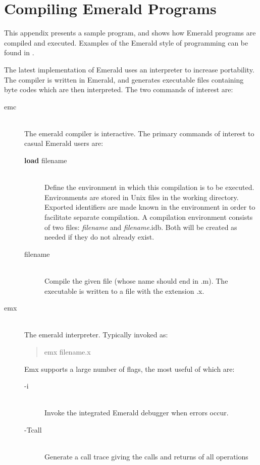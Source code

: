 \section{Compiling Emerald Programs}
\label{compiler appendix}

This appendix presents a sample \emd{} program, and shows how
Emerald programs are compiled and executed.
Examples of the Emerald style of programming can be found
in \cite{Raj90spe}.

The latest implementation of Emerald uses an interpreter to increase
portability.  The compiler is written in Emerald, and generates executable
files containing byte codes which are then interpreted.  The two commands of
interest are:
\begin{description}
  \item[emc]{}~\\
    The emerald compiler is interactive.  The primary commands of interest
    to casual Emerald users are:
    \begin{description}
      \item[{\bf load} filename]{} ~\\
	Define the environment in which this compilation is to be executed.
	Environments are stored in Unix files in the working directory.
	Exported identifiers are made known in the environment
	in order to facilitate separate compilation.  A compilation
	environment consists of two files:  {\it filename\/} and {\it
	filename\/}.idb.  Both will be created as needed if they do not
	already exist.
      \item[filename]{} ~\\
	Compile the given file (whose name should end in .m).  The
	executable is written to a file with the extension .x.
    \end{description}
  \item[emx]{} ~\\
    The emerald interpreter.  Typically invoked as:
    \begin{quote}
      emx filename.x
    \end{quote}
    Emx supports a large number of flags, the most useful of which are:
    \begin{description}
      \item[-i]{} ~\\
	Invoke the integrated Emerald debugger when errors occur.
      \item[-Tcall]{} ~\\
	Generate a call trace giving the calls and returns of all operations

\end{description}
\end{description}
